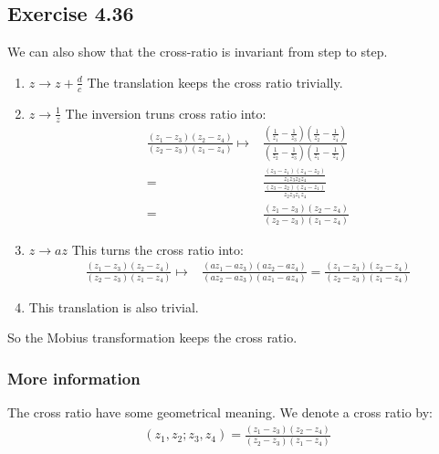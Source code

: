 \documentclass[]{ctexart}
\begin{document}
	\subsection{Exercise 4.36}
		We can also show that the cross-ratio is invariant from step to step. 
			\begin{enumerate}
				\item $z\rightarrow z+\frac{d}{c}$ The translation keeps the cross ratio trivially. 
				\item $z\rightarrow \frac{1}{z}$ The inversion truns cross ratio into:
					\begin{equation*}
					\begin{aligned}
						\frac{(z_1-z_3)(z_2-z_4)}{(z_2-z_3)(z_1-z_4)}\mapsto & \frac{\left(\frac{1}{z_1}-\frac{1}{z_3}\right)\left(\frac{1}{z_2}-\frac{1}{z_4}\right)}{\left(\frac{1}{z_2}-\frac{1}{z_3}\right)\left(\frac{1}{z_1}-\frac{1}{z_4}\right)}\\
						=&\frac{\frac{(z_3-z_1)(z_4-z_2)}{z_1z_3z_2z_4}}{\frac{(z_3-z_2)(z_4-z_1)}{z_2z_3z_1z_4}}\\
						=&\frac{(z_1-z_3)(z_2-z_4)}{(z_2-z_3)(z_1-z_4)}
					\end{aligned}
					\end{equation*}
				\item $z\rightarrow az$ This turns the cross ratio into:
					\begin{equation*}
					\begin{aligned}
						\frac{(z_1-z_3)(z_2-z_4)}{(z_2-z_3)(z_1-z_4)}\mapsto &\frac{(az_1-az_3)(az_2-az_4)}{(az_2-az_3)(az_1-az_4)}=\frac{(z_1-z_3)(z_2-z_4)}{(z_2-z_3)(z_1-z_4)}
					\end{aligned}
					\end{equation*}
				\item This translation is also trivial. 
			\end{enumerate}
		
		So the Mobius transformation keeps the cross ratio. 
			
			\subsubsection{More information}
				The cross ratio have some geometrical meaning. We denote a cross ratio by:
					\begin{equation*}
					\begin{aligned}
						(z_1,z_2;z_3,z_4)=\frac{(z_1-z_3)(z_2-z_4)}{(z_2-z_3)(z_1-z_4)}
					\end{aligned}
					\end{equation*}
					
\end{document}
